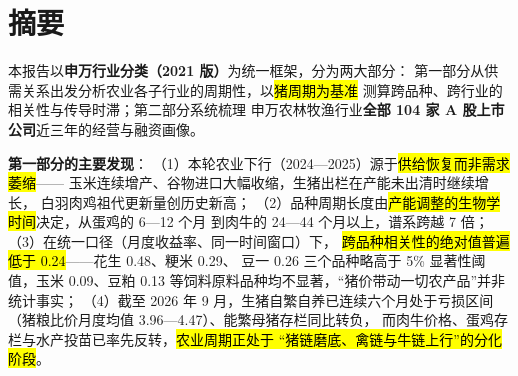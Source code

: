 \section*{摘要}

\begin{keybox}[报告要点]
\small
本报告以\textbf{申万行业分类（2021 版）}为统一框架，分为两大部分：
第一部分从供需关系出发分析农业各子行业的周期性，以\hl{猪周期为基准}
测算跨品种、跨行业的相关性与传导时滞；第二部分系统梳理
申万农林牧渔行业\textbf{全部 \num{104} 家 A 股上市公司}近三年的经营与融资画像。

\textbf{第一部分的主要发现}：
（1）本轮农业下行（2024---2025）源于\hl{供给恢复而非需求萎缩}——
玉米连续增产、谷物进口大幅收缩，生猪出栏在产能未出清时继续增长，
白羽肉鸡祖代更新量创历史新高；
（2）品种周期长度由\hl{产能调整的生物学时间}决定，从蛋鸡的 \num{6}---\num{12} 个月
到肉牛的 \num{24}---\num{44} 个月以上，谱系跨越 \num{7} 倍；
（3）在统一口径（月度收益率、同一时间窗口）下，
\hl{跨品种相关性的绝对值普遍低于 \num{0.24}}——花生 \num{+0.48}、粳米 \num{+0.29}、
豆一 \num{+0.26} 三个品种略高于 5\% 显著性阈值，玉米 \num{+0.09}、豆粕 \num{+0.13}
等饲料原料品种均不显著，“猪价带动一切农产品”并非统计事实；
（4）截至 2026 年 9 月，生猪自繁自养已连续六个月处于亏损区间
（猪粮比价月度均值 \num{3.96}---\num{4.47}）、能繁母猪存栏同比转负，
而肉牛价格、蛋鸡存栏与水产投苗已率先反转，\hl{农业周期正处于
“猪链磨底、禽链与牛链上行”的分化阶段}。


\end{keybox}
